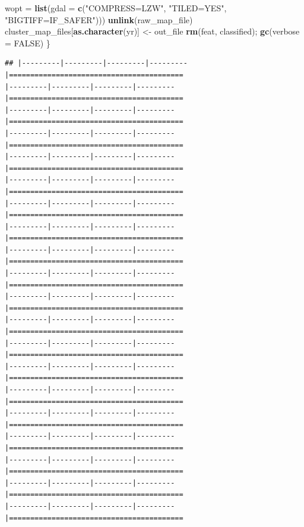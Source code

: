 \documentclass[
]{article}
\newenvironment{Shaded}{\begin{snugshade}}{\end{snugshade}}
\newcommand{\AttributeTok}[1]{\textcolor[rgb]{0.13,0.29,0.53}{#1}}
\newcommand{\ConstantTok}[1]{\textcolor[rgb]{0.56,0.35,0.01}{#1}}
\newcommand{\FunctionTok}[1]{\textcolor[rgb]{0.13,0.29,0.53}{\textbf{#1}}}
\newcommand{\NormalTok}[1]{#1}
\newcommand{\OtherTok}[1]{\textcolor[rgb]{0.56,0.35,0.01}{#1}}
\newcommand{\StringTok}[1]{\textcolor[rgb]{0.31,0.60,0.02}{#1}}
\begin{document}
\begin{Shaded}
\begin{Highlighting}[]
                     \AttributeTok{wopt =} \FunctionTok{list}\NormalTok{(}\AttributeTok{gdal =} \FunctionTok{c}\NormalTok{(}\StringTok{"COMPRESS=LZW"}\NormalTok{, }\StringTok{"TILED=YES"}\NormalTok{, }\StringTok{"BIGTIFF=IF\_SAFER"}\NormalTok{)))}
  \FunctionTok{unlink}\NormalTok{(raw\_map\_file)}
\NormalTok{  cluster\_map\_files[}\FunctionTok{as.character}\NormalTok{(yr)] }\OtherTok{\textless{}{-}}\NormalTok{ out\_file}
  \FunctionTok{rm}\NormalTok{(feat, classified); }\FunctionTok{gc}\NormalTok{(}\AttributeTok{verbose =} \ConstantTok{FALSE}\NormalTok{)}
\NormalTok{\}}
\end{Highlighting}
\end{Shaded}

\begin{verbatim}
## |---------|---------|---------|---------|=========================================                                          |---------|---------|---------|---------|=========================================                                          |---------|---------|---------|---------|=========================================                                          |---------|---------|---------|---------|=========================================                                          |---------|---------|---------|---------|=========================================                                          |---------|---------|---------|---------|=========================================                                          |---------|---------|---------|---------|=========================================                                          |---------|---------|---------|---------|=========================================                                          |---------|---------|---------|---------|=========================================                                          |---------|---------|---------|---------|=========================================                                          |---------|---------|---------|---------|=========================================                                          |---------|---------|---------|---------|=========================================                                          |---------|---------|---------|---------|=========================================                                          |---------|---------|---------|---------|=========================================                                          |---------|---------|---------|---------|=========================================                                          |---------|---------|---------|---------|=========================================                                          |---------|---------|---------|---------|=========================================                                          |---------|---------|---------|---------|=========================================                                          |---------|---------|---------|---------|=========================================                                          |---------|---------|---------|---------|=========================================                      
\end{verbatim}
\end{document}
